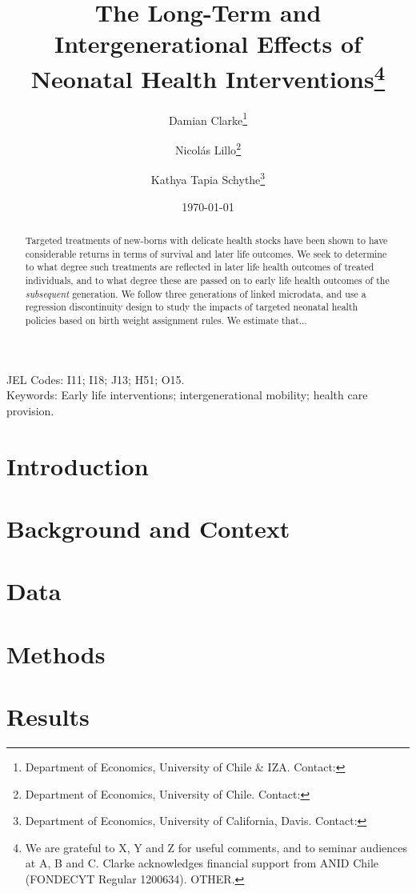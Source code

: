 \documentclass[11pt]{article}
\title{The Long-Term and Intergenerational Effects of Neonatal Health Interventions\thanks{We are grateful to X, Y and Z for useful comments, and to seminar audiences at A, B and C. Clarke acknowledges financial support from ANID Chile (FONDECYT Regular 1200634).  OTHER.  }}
\author{Damian Clarke\thanks{Department of Economics, University of Chile \& IZA.  Contact:}
  \and Nicol\'as Lillo\thanks{Department of Economics, University of Chile.  Contact:}
  \and Kathya Tapia Schythe\thanks{Department of Economics, University of California, Davis.  Contact:}
}
\date{\today}
\begin{document}
\begin{spacing}{1.5}
  \maketitle

  \begin{abstract}
    Targeted treatments of new-borns with delicate health stocks have been shown to have considerable returns in terms of survival and later life outcomes.  We seek to determine to what degree such treatments are reflected in later life health outcomes of treated individuals, and to what degree these are passed on to early life health outcomes of the \emph{subsequent} generation.  We follow three generations of linked microdata, and use a regression discontinuity design to study the impacts of targeted neonatal health policies based on birth weight assignment rules.  We estimate that...
  \end{abstract}

  \noindent JEL Codes: I11; I18; J13; H51; O15. \\
  Keywords: Early life interventions; intergenerational mobility; health care provision. \\

  \clearpage

  \section{Introduction}

  \clearpage
  \section{Background and Context}
  \citet{Almondetal2010,Bharadwajetal2013}
  
  
  \clearpage
  \section{Data}

  \clearpage
  \section{Methods}

  \clearpage
  \section{Results}


\end{spacing}
\end{document}
